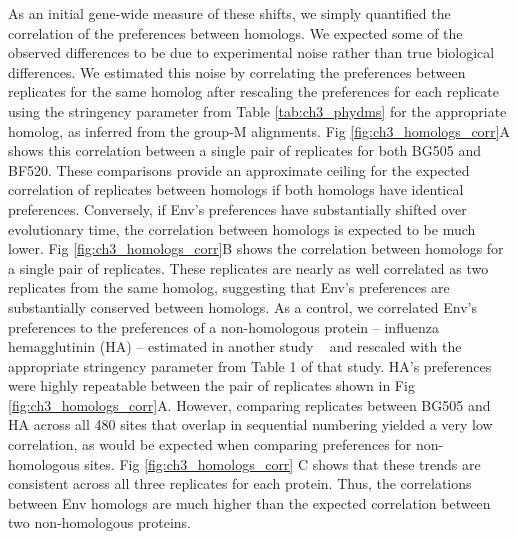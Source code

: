 \documentclass[9pt,lineno]{elife}
\begin{document}
As an initial gene-wide measure of these shifts, we simply quantified the correlation of the preferences between homologs.
We expected some of the observed differences to be due to experimental noise rather than true biological differences.
We estimated this noise by correlating the preferences between replicates for the same homolog after rescaling the preferences for each replicate using the stringency parameter from Table \ref{tab:ch3_phydms} for the appropriate homolog, as inferred from the group-M alignments.
Fig \ref{fig:ch3_homologs_corr}A shows this correlation between a single pair of replicates for both BG505 and BF520.
These comparisons provide an approximate ceiling for the expected correlation of replicates between homologs if both homologs have identical preferences.
Conversely, if Env's preferences have substantially shifted over evolutionary time, the correlation between homologs is expected to be much lower.
Fig \ref{fig:ch3_homologs_corr}B shows the correlation between homologs for a single pair of replicates.
These replicates are nearly as well correlated as two replicates from the same homolog, suggesting that Env's preferences are substantially conserved between homologs.
As a control, we correlated Env's preferences to the preferences of a non-homologous protein -- influenza hemagglutinin (HA) -- estimated in another study ~\cite{doud2016accurate} and rescaled with the appropriate stringency parameter from Table 1 of that study.
HA's preferences were highly repeatable between the pair of replicates shown in Fig \ref{fig:ch3_homologs_corr}A.
However, comparing replicates between BG505 and HA across all 480 sites that overlap in sequential numbering yielded a very low correlation, as would be expected when comparing preferences for non-homologous sites.
Fig \ref{fig:ch3_homologs_corr} C shows that these trends are consistent across all three replicates for each protein.
Thus, the correlations between Env homologs are much higher than the expected correlation between two non-homologous proteins.
\end{document}
